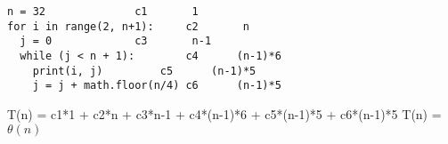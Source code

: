 \documentclass[addpoints,11pt]{exam}
\begin{document}
\begin{questions}
\begin{solutionorbox}
\begin{enumerate}[label=(\roman*)]
		\begin{lstlisting}
n = 32				c1		 1
for i in range(2, n+1):		c2		 n
  j = 0				c3	 	 n-1
  while (j < n + 1):		c4		(n-1)*6
    print(i, j)			c5 		(n-1)*5	
    j = j + math.floor(n/4)	c6		(n-1)*5
		\end{lstlisting}
		
		T(n) = c1*1 + c2*n + c3*n-1 + c4*(n-1)*6 + c5*(n-1)*5 + c6*(n-1)*5
		T(n) = $\theta(n)$
	
	\end{enumerate}
	
\end{solutionorbox}

\ifprintanswers
\newpage
\else
\bigskip
\fi

\end{questions}
\end{document}
